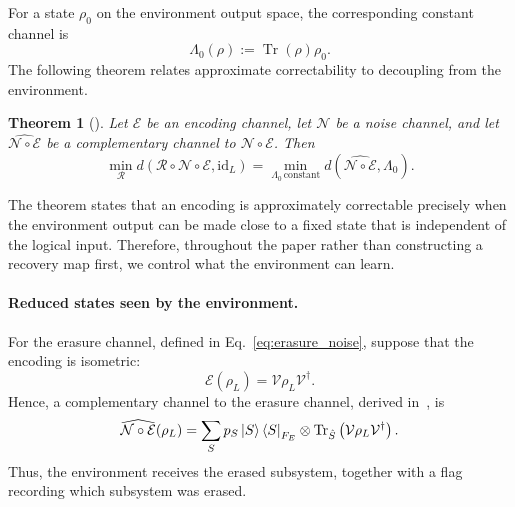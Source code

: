 \documentclass[10pt,twocolumn,superscriptaddress,aps,amsmath,amssymb,citeautoscript,floatfix,prx]{revtex4-2}
\newtheorem{theorem}{Theorem}
\theoremstyle{plain}
\theoremstyle{plain}
\theoremstyle{plain}
\theoremstyle{plain}
\theoremstyle{plain}
\theoremstyle{plain}
\theoremstyle{plain}
\theoremstyle{definition}
\theoremstyle{plain}
\begin{document}
For a state $\rho_0$ on the environment output space, the corresponding constant channel is
\begin{equation}\label{eq:constant_channel_def}
\Lambda_0(\rho)
:=
\operatorname{Tr}(\rho)\rho_0 .
\end{equation}
The following theorem relates approximate correctability to decoupling from the environment.

\begin{theorem}[\citet{Beny2010}]\label{thm:beny}
Let $\mathcal E$ be an encoding channel, let $\mathcal N$ be a noise channel, and let $\widehat{\mathcal N\circ\mathcal E}$ be a complementary channel to $\mathcal N\circ\mathcal E$. Then
\begin{equation}\label{eq:beny}
    \min_{\mathcal R}
    d\left(
        \mathcal R\circ\mathcal N\circ\mathcal E,
        \mathrm{id}_L
    \right)
    =
    \min_{\Lambda_0\,\mathrm{constant}}
    d\left(
        \widehat{\mathcal N\circ\mathcal E},
        \Lambda_0
    \right).
\end{equation}
\end{theorem}

The theorem states that an encoding is approximately correctable precisely when the environment output can be made close to a fixed state that is independent of the logical input. 
Therefore, throughout the paper rather than constructing a recovery map first, we control what the environment can learn.

\paragraph{Reduced states seen by the environment.}

For the erasure channel, defined in Eq.~\eqref{eq:erasure_noise}, suppose that the encoding is isometric:
\begin{equation}\label{eq:enc_isom}
\mathcal E(\rho_L)
=
\mathcal{V}\rho_L\mathcal{V}^\dagger .
\end{equation}
Hence, a complementary channel to the erasure channel, derived in~\cite{Faist2020}, is
\begin{equation}\label{eq:dual_to_erasure}
\widehat{\mathcal N\circ\mathcal E}(\rho_L)
=
\sum_S
p_S
\ket S\bra S_{F_E}
\otimes
\operatorname{Tr}_{\hat S}
\left(
\mathcal{V}\rho_L\mathcal{V}^\dagger
\right).
\end{equation}
Thus, the environment receives the erased subsystem, together with a flag recording which subsystem was erased.
\end{document}
